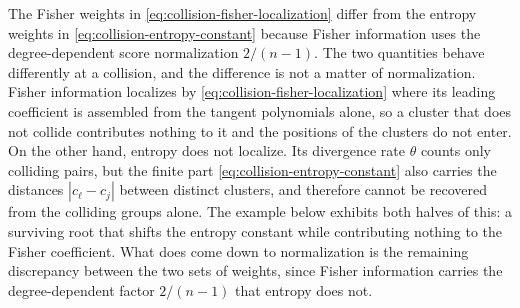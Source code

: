 \documentclass[12pt,reqno]{amsart}
\theoremstyle{definition}
\theoremstyle{remark}
\begin{document}
The Fisher weights in \eqref{eq:collision-fisher-localization} differ
from the entropy weights in \eqref{eq:collision-entropy-constant}
because Fisher information uses the degree-dependent score normalization
\(2/(n-1)\).  
The two quantities behave differently at a collision, and the difference is not a matter of normalization. Fisher information localizes by
\eqref{eq:collision-fisher-localization} where its leading coefficient is
assembled from the tangent polynomials alone, so a cluster that does not
collide contributes nothing to it and the positions of the clusters do not
enter.  On the other hand, entropy does not localize.  Its divergence rate \(\theta\) counts only colliding pairs, but the finite part
\eqref{eq:collision-entropy-constant} also carries the distances
\(|c_\ell-c_j|\) between distinct clusters, and therefore cannot be
recovered from the colliding groups alone. The example below exhibits both
halves of this: a surviving root that shifts the entropy constant while
contributing nothing to the Fisher coefficient.  What does come down to
normalization is the remaining discrepancy between the two sets of weights, since Fisher information carries the degree-dependent factor \(2/(n-1)\) that entropy does not.
\end{document}

